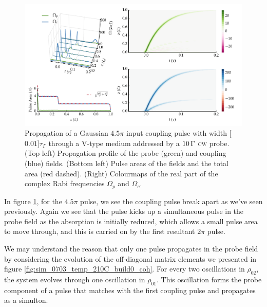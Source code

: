     \begin{figure}%
    \includegraphics[width=\linewidth]
      {figs/06_simultons/mb_vee_sit_plot_45pi_Ng1e4_fig1.pdf}
    \caption{
    Propagation of a Gaussian $4.5 \pi$ input coupling pulse with width
    \unit[$0.01$]{$\tau_\Gamma$} through a V-type medium addressed by a
    $\unit[10]{\Gamma}$ \textsc{cw} probe. (Top left) Propagation profile of the
    probe (green) and coupling (blue) fields. (Bottom left) Pulse areas of the
    fields and the total area (red dashed). (Right) Colourmaps of the real part
    of the complex Rabi frequencies $\Omega_{p}$ and $\Omega_{c}$.
    }
    \label{fig:pulse_cw_4pi_cmap}
    \end{figure}

    In figure \ref{fig:pulse_cw_4pi_cmap}, for the $4.5 \pi$ pulse, we see the
    coupling pulse break apart as we've seen previously. Again we see that the
    pulse kicks up a simultaneous pulse in the probe field as the absorption is
    initially reduced, which allows a small pulse area to move through, and this
    is carried on by the first resultant $2 \pi$ pulse.

    We may understand the reason that only one pulse propagates in the probe
    field by considering the evolution of the off-diagonal matrix elements we
    presented in figure \ref{fig:sim_0703_temp_210C_build0_coh}. For every two
    oscillations in $\rho_{02}$, the system evolves through one oscillation in
    $\rho_{01}$. This oscillation forms the probe component of a pulse that
    matches with the first coupling pulse and propagates as a simulton.

